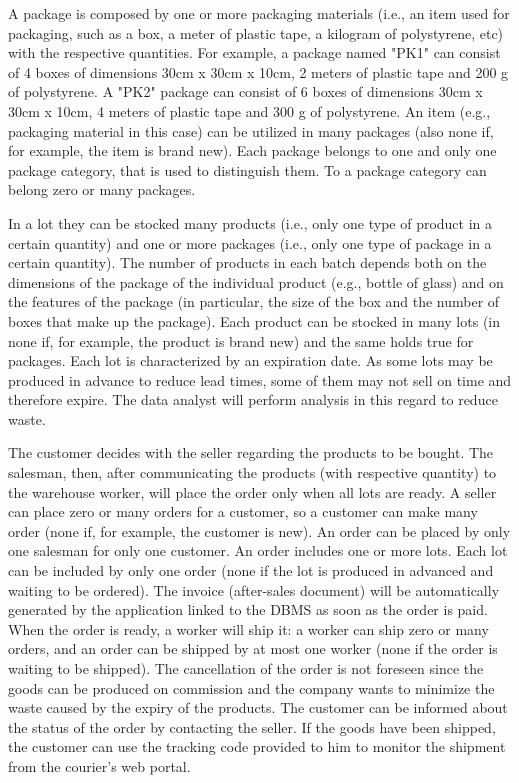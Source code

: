 A package is composed by one or more packaging materials (i.e., an item used for packaging, such as a box, a meter of plastic tape, a kilogram of polystyrene, etc) with the respective quantities. For example, a package named "PK1" can consist of 4 boxes of dimensions 30cm x 30cm x 10cm, 2 meters of plastic tape and 200 g of polystyrene. A "PK2" package can consist of 6 boxes of dimensions 30cm x 30cm x 10cm, 4 meters of plastic tape and 300 g of polystyrene. An item (e.g., packaging material in this case) can be utilized in many packages (also none if, for example, the item is brand new). Each package belongs to one and only one package category, that is used to distinguish them. To a package category can belong zero or many packages.

In a lot they can be stocked many products (i.e., only one type of product in a certain quantity) and one or more packages (i.e., only one type of package in a certain quantity). The number of products in each batch depends both on the dimensions of the package of the individual product (e.g., bottle of glass) and on the features of the package (in particular, the size of the box and the number of boxes that make up the package). Each product can be stocked in many lots (in none if, for example, the product is brand new) and the same holds true for packages. Each lot is characterized by an expiration date. As some lots may be produced in advance to reduce lead times, some of them may not sell on time and therefore expire. The data analyst will perform analysis in this regard to reduce waste.

The customer decides with the seller regarding the products to be bought. The salesman, then, after communicating the products (with respective quantity) to the warehouse worker, will place the order only when all lots are ready. A seller can place zero or many orders for a customer, so a customer can make many order (none if, for example, the customer is new). An order can be placed by only one salesman for only one customer. An order includes one or more lots. Each lot can be included by only one order (none if the lot is produced in advanced and waiting to be ordered). The invoice (after-sales document) will be automatically generated by the application linked to the DBMS as soon as the order is paid.
When the order is ready, a worker will ship it: a worker can ship zero or many orders, and an order can be shipped by at most one worker (none if the order is waiting to be shipped). The cancellation of the order is not foreseen since the goods can be produced on commission and the company wants to minimize the waste caused by the expiry of the products. The customer can be informed about the status of the order by contacting the seller. If the goods have been shipped, the customer can use the tracking code provided to him to monitor the shipment from the courier's web portal.
